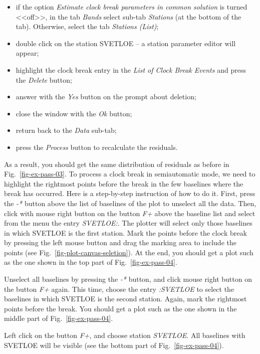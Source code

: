 \documentclass [10pt,letterpaper]{report}
\begin{document}
\begin{itemize}
\item[--] if the option {\sl Estimate clock break parameters in common solution}
          is turned <<off>>, in the tab {\sl Bands} select sub-tab {\sl Stations}
          (at the bottom of the tab). Otherwise, select the tab {\sl Stations (List)};
\item[--] double click on the station SVETLOE -- a station parameter
          editor will appear;
\item[--] highlight the clock break entry in the {\sl List of Clock
          Break Events} and press the {\sl Delete} button;
\item[--] answer with the {\sl Yes} button on the prompt about
          deletion;
\item[--] close the window with the {\sl Ok} button;
\item[--] return back to the {\sl Data} sub-tab;
\item[--] press the {\sl Process} button to recalculate the
          residuals.
\end{itemize}


As a result, you should get the same distribution of residuals as before
in Fig.~\ref{fig-ex-pass-03}. To process a clock break in semiautomatic mode, we
need to highlight the rightmost points before the break in the few
baselines where the break has occurred. Here is a step-by-step
instruction of how to do it. First, press the {\sl -*} button above
the list of baselines of the plot to unselect all the data. Then, click
with mouse right button on the button {\sl F+} above the baseline
list and select from the menu the entry {\sl SVETLOE:}. The plotter
will select only those baselines in which SVETLOE is the first station.
Mark the points before the clock break by pressing the left mouse button
and drag the marking area to include the points (see
Fig.~\ref{fig-plot-canvas-seletion}). At the end, you should get a plot
such as the one shown in the top part of Fig.~\ref{fig-ex-pass-04}.



Unselect all baselines by pressing the {\sl -*} button, and click
mouse right button on the button {\sl F+} again. This time, choose
the entry {\sl :SVETLOE} to select the baselines in which SVETLOE is
the second station. Again, mark the rightmost points before the break.
You should get a plot such as the one shown in the middle part of
Fig.~\ref{fig-ex-pass-04}.

Left click on the button {\sl F+}, and choose station {\sl SVETLOE}.
All baselines with SVETLOE will be visible (see the bottom part of
Fig.~\ref{fig-ex-pass-04}).
\end{document}
